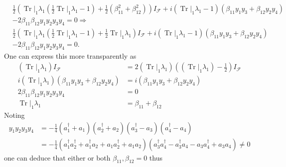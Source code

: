\documentclass[aps, preprint]{revtex4}
\begin{document}
\begin{align} & \frac{1}{2} \left (\left .\ensuremath{\operatorname*{Tr}}\right \vert _{1} \lambda _{1} \left (\frac{1}{2} \left .\ensuremath{\operatorname*{Tr}}\right \vert _{1} \lambda _{1} -1\right ) +\frac{1}{2} \left (\beta _{1 1}^{2} +\beta _{1 2}^{2}\right )\right ) I_{\mathcal{F}} +i \left (\left .\ensuremath{\operatorname*{Tr}}\right \vert _{1} \lambda _{1} -1\right ) \left (\beta _{1 1} y_{1} y_{3} +\beta _{1 2} y_{2} y_{4}\right ) \nonumber  \\
 &  -2 \beta _{1 1} \beta _{1 2} y_{1} y_{2} y_{3} y_{4} =0 \Longrightarrow  \nonumber  \\
 & \frac{1}{2} \left (\left .\ensuremath{\operatorname*{Tr}}\right \vert _{1} \lambda _{1} \left (\frac{1}{2} \left .\ensuremath{\operatorname*{Tr}}\right \vert _{1} \lambda _{1} -1\right ) +\frac{1}{2} \left .\ensuremath{\operatorname*{Tr}}\right \vert _{1} \lambda _{1}\right ) I_{\mathcal{F}} +i \left (\left .\ensuremath{\operatorname*{Tr}}\right \vert _{1} \lambda _{1} -1\right ) \left (\beta _{1 1} y_{1} y_{3} +\beta _{1 2} y_{2} y_{4}\right ) \nonumber  \\
 &  -2 \beta _{1 1} \beta _{1 2} y_{1} y_{2} y_{3} y_{4} =0.\end{align}One can express this more transparently as
\begin{align}\left (\left .\ensuremath{\operatorname*{Tr}}\right \vert _{1} \lambda _{1}\right ) I_{\mathcal{F}} &  =2 \left (\left .\ensuremath{\operatorname*{Tr}}\right \vert _{1} \lambda _{1}\right ) \left (\left (\left .\ensuremath{\operatorname*{Tr}}\right \vert _{1} \lambda _{1}\right ) -\frac{1}{2}\right ) I_{\mathcal{F}} \\
i \left (\left .\ensuremath{\operatorname*{Tr}}\right \vert _{1} \lambda _{1}\right ) \left (\beta _{1 1} y_{1} y_{3} +\beta _{1 2} y_{2} y_{4}\right ) &  =i \left (\beta _{1 1} y_{1} y_{3} +\beta _{1 2} y_{2} y_{4}\right ) \\
2 \beta _{1 1} \beta _{1 2} y_{1} y_{2} y_{3} y_{4} &  =0 \\
\left .\ensuremath{\operatorname*{Tr}}\right \vert _{1} \lambda _{1} &  =\beta _{1 1} +\beta _{1 2}\end{align}Noting
\begin{align}y_{1} y_{2} y_{3} y_{4} &  = -\frac{1}{4} \left (a_{1}^{ \dag } +a_{1}\right ) \left (a_{2}^{ \dag } +a_{2}\right ) \left (a_{3}^{ \dag } -a_{3}\right ) \left (a_{4}^{ \dag } -a_{4}\right ) \nonumber  \\
 &  = -\frac{1}{4} \left (a_{1}^{ \dag } a_{2}^{ \dag } +a_{1}^{ \dag } a_{2} +a_{1} a_{2}^{ \dag } +a_{1} a_{2}\right ) \left (a_{3}^{ \dag } a_{4}^{ \dag } -a_{3}^{ \dag } a_{4} -a_{3} a_{4}^{ \dag } +a_{3} a_{4}\right ) \neq 0\end{align}one can deduce that either or both $\beta _{1 1} ,\beta _{1 2} =0$ thus
\end{document}
